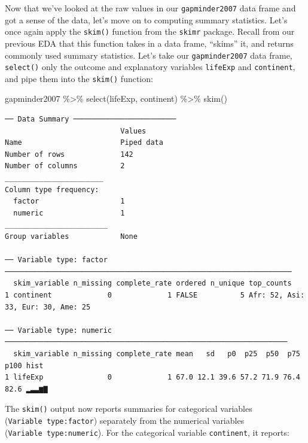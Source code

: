 \documentclass[
  letterpaper,
  DIV=11,
  numbers=noendperiod]{scrreprt}
\newenvironment{Shaded}{\begin{snugshade}}{\end{snugshade}}
\newcommand{\FunctionTok}[1]{\textcolor[rgb]{0.28,0.35,0.67}{#1}}
\newcommand{\NormalTok}[1]{\textcolor[rgb]{0.00,0.23,0.31}{#1}}
\newcommand{\SpecialCharTok}[1]{\textcolor[rgb]{0.37,0.37,0.37}{#1}}
\theoremstyle{definition}
\theoremstyle{remark}
\begin{document}
Now that we've looked at the raw values in our \texttt{gapminder2007}
data frame and got a sense of the data, let's move on to computing
summary statistics. Let's once again apply the \texttt{skim()} function
from the \texttt{skimr} package. Recall from our previous EDA that this
function takes in a data frame, ``skims'' it, and returns commonly used
summary statistics. Let's take our \texttt{gapminder2007} data frame,
\texttt{select()} only the outcome and explanatory variables
\texttt{lifeExp} and \texttt{continent}, and pipe them into the
\texttt{skim()} function:

\begin{Shaded}
\begin{Highlighting}[]
\NormalTok{gapminder2007 }\SpecialCharTok{\%\textgreater{}\%}
  \FunctionTok{select}\NormalTok{(lifeExp, continent) }\SpecialCharTok{\%\textgreater{}\%}
  \FunctionTok{skim}\NormalTok{()}
\end{Highlighting}
\end{Shaded}

\begin{verbatim}
── Data Summary ────────────────────────
                           Values    
Name                       Piped data
Number of rows             142       
Number of columns          2         
_______________________              
Column type frequency:               
  factor                   1         
  numeric                  1         
________________________             
Group variables            None      

── Variable type: factor ───────────────────────────────────────────────────────────────────
  skim_variable n_missing complete_rate ordered n_unique top_counts                        
1 continent             0             1 FALSE          5 Afr: 52, Asi: 33, Eur: 30, Ame: 25

── Variable type: numeric ──────────────────────────────────────────────────────────────────
  skim_variable n_missing complete_rate mean   sd   p0  p25  p50  p75 p100 hist 
1 lifeExp               0             1 67.0 12.1 39.6 57.2 71.9 76.4 82.6 ▂▃▃▆▇
\end{verbatim}

The \texttt{skim()} output now reports summaries for categorical
variables (\texttt{Variable\ type:factor}) separately from the numerical
variables (\texttt{Variable\ type:numeric}). For the categorical
variable \texttt{continent}, it reports:
\end{document}
